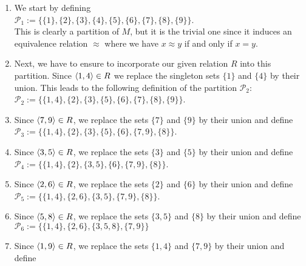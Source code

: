 \begin{enumerate}
\item We start by defining
      \\[0.2cm]
      \hspace*{1.3cm}
      $\mathcal{P}_1 := \bigl\{ \{1\}, \{2\}, \{3\}, \{4\}, \{5\}, \{6\}, \{7\}, \{8\}, \{9\} \bigr\}$.
      \\[0.2cm]
      This is clearly a partition of $M$, but it is the trivial one since it induces an equivalence
      relation $\approx$ where we have  $x \approx y$ if and only if $x = y$.  
\item Next, we have to ensure to incorporate our given relation $R$ into this partition.  Since $\pair(1,4) \in R$
      we replace the singleton sets $\{1\}$ and $\{4\}$ by their union.  This leads to the following
      definition of the partition $\mathcal{P}_2$:
      \\[0.2cm]
      \hspace*{1.3cm}
      $\mathcal{P}_2 := \bigl\{ \{1, 4\}, \{2\}, \{3\}, \{5\}, \{6\}, \{7\}, \{8\}, \{9\} \bigr\}$.
\item Since $\pair(7,9) \in R$, we replace the sets $\{7\}$ and $\{9\}$ by their union and define
      \\[0.2cm]
      \hspace*{1.3cm}
      $\mathcal{P}_3 := \bigl\{ \{1, 4\}, \{2\}, \{3\}, \{5\}, \{6\}, \{7, 9\}, \{8\} \bigr\}$.
\item Since $\pair(3,5) \in R$, we replace the sets $\{3\}$ and $\{5\}$ by their union and define
      \\[0.2cm]
      \hspace*{1.3cm}
      $\mathcal{P}_4 := \bigl\{ \{1, 4\}, \{2\}, \{3,5\}, \{6\}, \{7, 9\}, \{8\} \bigr\}$.
\item Since $\pair(2,6) \in R$, we replace the sets $\{2\}$ and $\{6\}$ by their union and define
      \\[0.2cm]
      \hspace*{1.3cm}
      $\mathcal{P}_5 := \bigl\{ \{1, 4\}, \{2,6\}, \{3,5\}, \{7, 9\}, \{8\} \bigr\}$.
\item Since $\pair(5,8) \in R$, we replace the sets $\{3,5\}$ and $\{8\}$ by their union and define
      \\[0.2cm]
      \hspace*{1.3cm}
      $\mathcal{P}_6 := \bigl\{ \{1, 4\}, \{2,6\}, \{3,5,8\}, \{7, 9\} \bigr\}$
\item Since $\pair(1,9) \in R$, we replace the sets $\{1,4\}$ and $\{7,9\}$ by their union and define

\end{enumerate}
